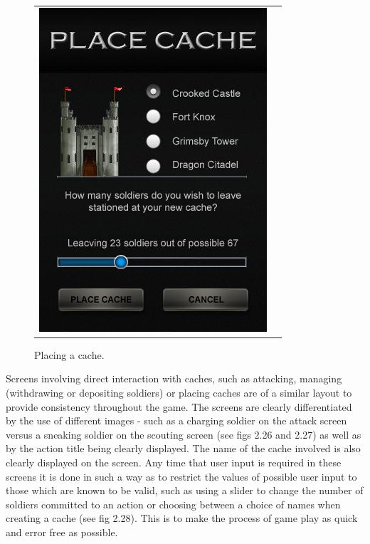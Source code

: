 \begin{figure}[h!]
\begin{tabular}{cc}
\begin{minipage}{0.3\textwidth}
\begin{center}
\begin{minipage}{0.83\textwidth}
		\includegraphics[width=\textwidth]{images/place_cache_mockup}
	\caption{Placing a cache.}
		\label{placing_cache}
		\end{minipage}
		\end{center}
	\end{minipage}
\end{tabular}
\vspace{-0pt}
\end{figure}

 Screens involving direct interaction with caches, such as attacking, managing (withdrawing or depositing soldiers) or placing caches are of a similar layout to provide consistency throughout the game. The screens are clearly differentiated by the use of different images - such as a charging soldier on the attack screen versus a sneaking soldier on the scouting screen (see figs 2.26 and 2.27) as well as by the action title being clearly displayed. The name of the cache involved is also clearly displayed on the screen. Any time that user input is required in these screens it is done in such a way as to restrict the values of possible user input to those which are known to be valid, such as using a slider to change the number of soldiers committed to an action or choosing between a choice of names when creating a cache (see fig 2.28). This is to make the process of game play as quick and error free as possible.

